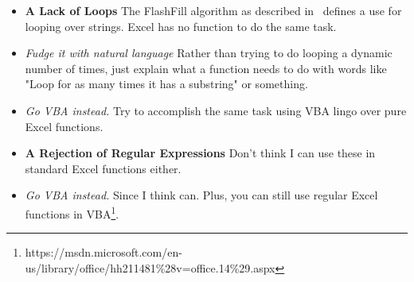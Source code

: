 \documentclass[11pt]{article} \usepackage{cite} \usepackage{marginnote}
\begin{document}
	\begin{itemize}
		\item[P1] \textbf{A Lack of Loops} The FlashFill algorithm as described in~\cite{gulwani2011automating} defines a use for looping over strings.
		Excel has no function to do the same task.
		
		\item[S1.1] \textit{Fudge it with natural language} Rather than trying
		to do looping a dynamic number of times, just explain what a function
		needs to do with words like "Loop for as many times it has a substring"
		or something.
		
		\item[S1.2] \textit{Go VBA instead.} Try to accomplish the same task
		using VBA lingo over pure Excel functions.
		
		\item[P2] \textbf{A Rejection of Regular Expressions} Don't think I can use these in standard Excel functions either.
		
		\item[S2.1] \textit{Go VBA instead.} Since I think can. Plus, you can still
		use regular Excel functions in VBA\footnote{https://msdn.microsoft.com/en-us/library/office/hh211481\%28v=office.14\%29.aspx}.
	\end{itemize}
	
	{} 
	
\end{document}
